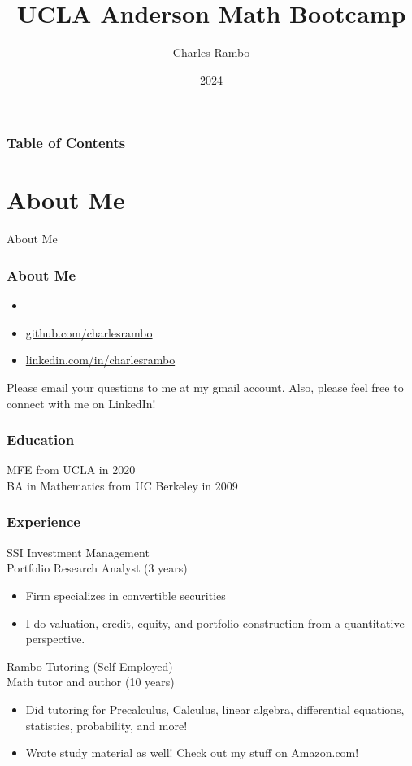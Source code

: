 \documentclass{beamer}
\title{UCLA Anderson Math Bootcamp}
\author{Charles Rambo}
\institute{UCLA Anderson}
\date{2024}
\begin{document}


\frame{\titlepage}

\begin{frame}[allowframebreaks]

\frametitle{Table of Contents}
\tableofcontents
\end{frame}

\section{About Me}

\begin{frame}
\begin{center}
\Huge About Me
\end{center}
\end{frame}

\begin{frame}
\frametitle{About Me}

\begin{itemize}
\item {}
\item \url{github.com/charlesrambo}
\item \url{linkedin.com/in/charlesrambo}
\end{itemize}
Please email your questions to me at my gmail account. Also, please feel free to connect with me on LinkedIn!

\end{frame}

\begin{frame}
\frametitle{Education}

MFE from UCLA in 2020\\

BA in Mathematics from UC Berkeley in 2009
\end{frame}

\begin{frame}
\frametitle{Experience}
\small

SSI Investment Management\\
Portfolio Research Analyst (3 years)
\begin{itemize}
\item Firm specializes in convertible securities
\item I do valuation, credit, equity, and portfolio construction from a quantitative perspective.
\end{itemize}

Rambo Tutoring (Self-Employed)\\
Math tutor and author (10 years)
\begin{itemize}
\item Did tutoring for Precalculus, Calculus, linear algebra, differential equations, statistics, probability, and more!
\item Wrote study material as well! Check out my stuff on Amazon.com!
\end{itemize}
\end{frame}
\end{document}
